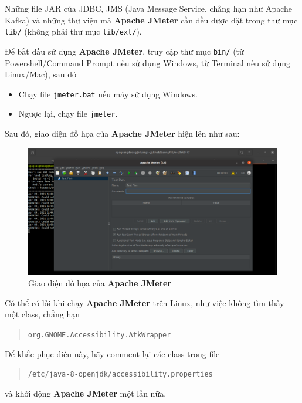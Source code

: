 \documentclass[10pt]{report}
\newcommand{\jmeter}{\textbf{Apache JMeter}}
\begin{document}
\par Những file JAR của JDBC, JMS (Java Message Service, chẳng hạn như Apache Kafka) và những thư viện mà \jmeter{} cần đều được đặt trong thư mục \texttt{lib/} (không phải thư mục \texttt{lib/ext/}).

\par Để bắt đầu sử dụng \jmeter{}, truy cập thư mục \texttt{bin/} (từ Powershell/Command Prompt nếu sử dụng Windows, từ Terminal nếu sử dụng Linux/Mac), sau đó
\begin{itemize}[itemsep=0pt]
  \item Chạy file \texttt{jmeter.bat} nếu máy sử dụng Windows.
  \item Ngược lại, chạy file \texttt{jmeter}.
\end{itemize}

\par Sau đó, giao diện đồ họa của \jmeter{} hiện lên như sau:

\FloatBarrier{}
\begin{figure}[htp]
  \centering
  \includegraphics[scale=0.33]{jmeter-gui.png}
  \caption{Giao diện đồ họa của \jmeter{}}
\end{figure}
\FloatBarrier{}

\par Có thể có lỗi khi chạy \jmeter{} trên Linux, như việc không tìm thấy một class, chẳng hạn
\begin{quotation}
\texttt{org.GNOME.Accessibility.AtkWrapper}
\end{quotation}

\par Để khắc phục điều này, hãy comment lại các class trong file
\begin{quotation}
\texttt{/etc/java-8-openjdk/accessibility.properties}
\end{quotation}
\par và khởi động \jmeter{} một lần nữa.
\end{document}
